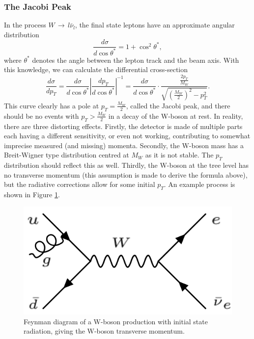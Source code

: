 \documentclass[twocolumn]{article}
\begin{document}
\subsubsection{The Jacobi Peak}
In the process $W \, \rightarrow \, l \bar{\nu}_l$, the final state leptons have an approximate angular distribution~\cite{manual}
\begin{equation}
\frac{d\sigma}{d\cos \theta^*} = 1 + \cos^2 \theta^*, \nonumber
\end{equation}
where $\theta^*$ denotes the angle between the lepton track and the beam axis.
With this knowledge, we can calculate the differential cross-section
\begin{equation}
\frac{d \sigma}{d p_T} = \frac{d \sigma}{d \cos \theta^*} \left\vert \frac{d p_T}{d \cos \theta^*} \right\vert^{-1} = \frac{d \sigma}{d \cos \theta^*} \cdot  \frac{\frac{2p_T}{M_W}}{\sqrt{\left( \frac{M_W}{2}\right)^2 - p_T^2}}. \nonumber
\end{equation}
This curve clearly has a pole at $p_T = \frac{M_W}{2}$, called the Jacobi peak, and there should be no events with $p_T > \frac{M_W}{2}$ in a decay of the W-boson at rest. In reality, there are three distorting effects. Firstly, the detector is made of multiple parts each having a different sensitivity, or even not working, contributing to somewhat imprecise measured (and missing) momenta. Secondly, the W-boson mass has a Breit-Wigner type distribution centred at $M_W$ as it is not stable. The $p_T$ distribution should reflect this as well. Thirdly, the W-boson at the tree level has no transverse momentum (this assumption is made to derive the formula above), but the radiative corrections allow for some initial $p_T$. An example process is shown in Figure \ref{fig:WRadiation}. 
\begin{figure} [!h]
\centering
\includegraphics[scale=0.25]{Images/WRadiation.png}
\caption{Feynman diagram of a W-boson production with initial state radiation, giving the W-boson transverse momentum.}
\label{fig:WRadiation}
\end{figure}
\end{document}
